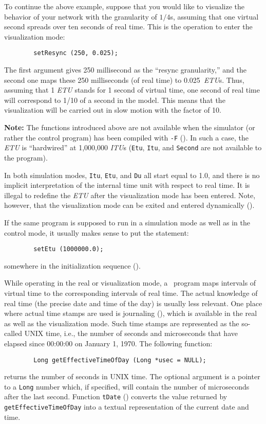 To continue the above example, suppose that you would like to visualize
the behavior of your network with the granularity of $1/4$s, assuming that
one virtual second spreads over ten seconds of real time.
This is the operation to enter the visualization mode:
\begin{verbatim}
        setResync (250, 0.025);
\end{verbatim}
\noindent
The first argument gives 250 millisecond as the ``resync granularity,''
and the second one maps these 250 milliseconds (of real time) to
0.025~{\em ETU\/}s.
Thus, assuming that 1 {\em ETU\/} stands for
1 second of virtual time, one second of
real time will correspond to 1/10 of a second in the model.
This means that the
visualization will be carried out in slow motion with the
factor of 10.

\medskip

\noindent
{\bf Note:} The functions introduced above are not available when
the simulator (or rather the control program) has been compiled with
{\tt -F} ().
In such a case, the {\em ETU\/} is ``hardwired'' at 1,000,000
{\em ITU\/}s ({\tt Etu}, {\tt Itu}, and {\tt Second} are not available
to the program).

\medskip

In both simulation modes,
{\tt Itu}, {\tt Etu}, and {\tt Du} all start equal to 1.0,
and there is no implicit interpretation of the internal time unit with
respect to real time.
It is illegal to redefine the {\em ETU\/} after the visualization mode
has been entered.
Note, however, that the visualization mode can be exited and entered
dynamically ().

If the same program is supposed to run in a simulation mode as well as in
the control mode, it usually makes sense to put the statement:
\begin{verbatim}
        setEtu (1000000.0);
\end{verbatim}
\noindent
somewhere in the initialization sequence ().

While operating in the real or visualization mode,
a \smurph\ program maps intervals of
virtual time to the corresponding intervals of real time.
The actual knowledge of real time (the precise date and time of the day) is
usually less relevant.
One place where actual time stamps are used is journaling
(), which is available in the real as well as the
visualization mode.
Such time stamps are represented as the so-called UNIX time, i.e.,
the number of seconds and microseconds that have elapsed
since 00:00:00 on January 1, 1970.
The following function:
\begin{verbatim}
        Long getEffectiveTimeOfDay (Long *usec = NULL);
\end{verbatim}
returns the number of seconds in UNIX time.
The optional argument is a pointer to a {\tt Long} number which,
if specified, will contain the number of microseconds after the
last second.
Function {\tt tDate} ()
converts the value returned by {\tt getEffectiveTimeOfDay} into a textual
representation of the current date and time.

